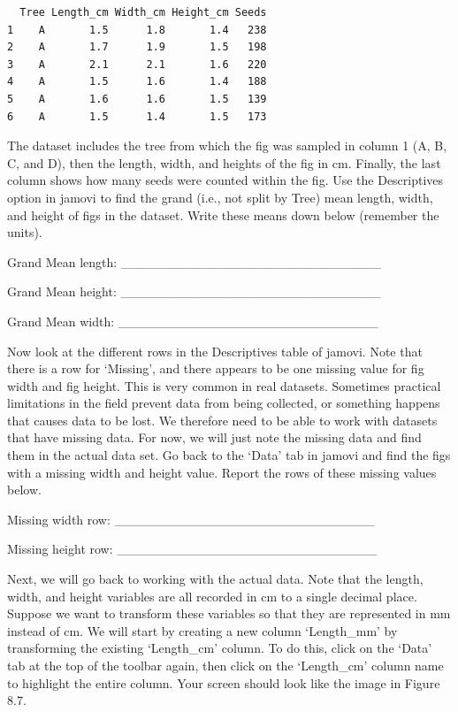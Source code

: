\documentclass[
]{scrbook}
\begin{document}
\begin{verbatim}
  Tree Length_cm Width_cm Height_cm Seeds
1    A       1.5      1.8       1.4   238
2    A       1.7      1.9       1.5   198
3    A       2.1      2.1       1.6   220
4    A       1.5      1.6       1.4   188
5    A       1.6      1.6       1.5   139
6    A       1.5      1.4       1.5   173
\end{verbatim}

The dataset includes the tree from which the fig was sampled in column 1 (A, B, C, and D), then the length, width, and heights of the fig in cm.
Finally, the last column shows how many seeds were counted within the fig.
Use the Descriptives option in jamovi to find the grand (i.e., not split by Tree) mean length, width, and height of figs in the dataset.
Write these means down below (remember the units).

Grand Mean length: \_\_\_\_\_\_\_\_\_\_\_\_\_\_\_\_\_\_\_\_\_\_\_\_\_\_\_\_

Grand Mean height: \_\_\_\_\_\_\_\_\_\_\_\_\_\_\_\_\_\_\_\_\_\_\_\_\_\_\_\_

Grand Mean width: \_\_\_\_\_\_\_\_\_\_\_\_\_\_\_\_\_\_\_\_\_\_\_\_\_\_\_\_

Now look at the different rows in the Descriptives table of jamovi.
Note that there is a row for `Missing', and there appears to be one missing value for fig width and fig height.
This is very common in real datasets.
Sometimes practical limitations in the field prevent data from being collected, or something happens that causes data to be lost.
We therefore need to be able to work with datasets that have missing data.
For now, we will just note the missing data and find them in the actual data set.
Go back to the `Data' tab in jamovi and find the figs with a missing width and height value.
Report the rows of these missing values below.

Missing width row: \_\_\_\_\_\_\_\_\_\_\_\_\_\_\_\_\_\_\_\_\_\_\_\_\_\_\_\_

Missing height row: \_\_\_\_\_\_\_\_\_\_\_\_\_\_\_\_\_\_\_\_\_\_\_\_\_\_\_\_

Next, we will go back to working with the actual data.
Note that the length, width, and height variables are all recorded in cm to a single decimal place.
Suppose we want to transform these variables so that they are represented in mm instead of cm.
We will start by creating a new column `Length\_mm' by transforming the existing `Length\_cm' column.
To do this, click on the `Data' tab at the top of the toolbar again, then click on the `Length\_cm' column name to highlight the entire column.
Your screen should look like the image in Figure 8.7.
\end{document}
